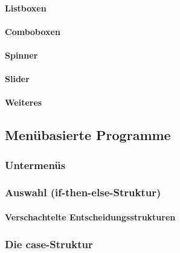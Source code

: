 \documentclass[a4paper, 11pt, accentcolor = tud3b]{tudreport}
\begin{document}
					\paragraph{Listboxen} %

					\paragraph{Comboboxen} %

					\paragraph{Spinner} %

					\paragraph{Slider} %

					\paragraph{Weiteres} %

			\subsection{Menübasierte Programme} %

				\subsubsection{Untermenüs} %

				\subsubsection{Auswahl (if-then-else-Struktur)} %

					\paragraph{Verschachtelte Entscheidungsstrukturen} %

				\subsubsection{Die case-Struktur} %
\end{document}
